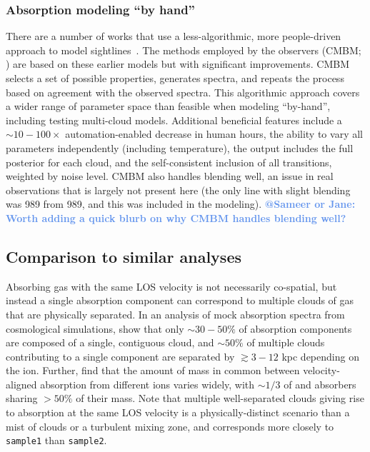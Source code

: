 \documentclass[fleqn,usenatbib]{mnras}
\makeatletter
\newcommand{\atsameer}[1]{\textcolor{CornflowerBlue}{\textbf{@Sameer or Jane: #1}}}
\makeatother
\begin{document}
\subsubsection{Absorption modeling ``by hand''}

There are a number of works that use a less-algorithmic, more people-driven approach to model sightlines~\citep[e.g.][]{churchill1999Multiple, charlton2000anticipating, charlton2003high, ding2003quadruple, ding2003multiphase, ding2005absorption, zonak2004absorption, masiero2005models, lynch2007physical, misawa2008supersolar, lacki2010z, jones2010bare, muzahid2015Extreme, richter2018New, rosenwasser2018understanding, norris2021Discovery}.
The methods employed by the observers (CMBM; \citealt{sameer2021Cloudbycloud, sameer2022Probing}) are based on these earlier models but with significant improvements.
CMBM selects a set of possible properties, generates spectra, and repeats the process based on agreement with the observed spectra.
This algorithmic approach covers a wider range of parameter space than feasible when modeling ``by-hand'', including testing multi-cloud models.
Additional beneficial features include
a $\sim 10-100 \times$ automation-enabled decrease in human hours,
the ability to vary all parameters independently (including temperature),
the output includes the full posterior for each cloud,
and the self-consistent inclusion of all transitions, weighted by noise level.
CMBM also handles blending well, an issue in real observations that is largely not present here
(the only line with slight blending was  989 from  989, and this was included in the modeling).
\atsameer{Worth adding a quick blurb on why CMBM handles blending well?}

\subsection{Comparison to similar analyses}

Absorbing gas with the same LOS velocity is not necessarily co-spatial, but instead a single absorption component can correspond to multiple clouds of gas that are physically separated.
In an analysis of mock absorption spectra from cosmological simulations, \cite{marra2022Examining} show that only $\sim 30-50\%$ of absorption components are composed of a single, contiguous cloud, and $\sim 50\%$ of multiple clouds contributing to a single component are separated by $\gtrsim 3-12$ kpc depending on the ion.
Further, \cite{marra2022Examining} find that the amount of mass in common between velocity-aligned absorption from different ions varies widely, with $\sim 1/3$ of  and  absorbers sharing $>50\%$ of their mass.
Note that multiple well-separated clouds giving rise to absorption at the same LOS velocity is a physically-distinct scenario than a mist of clouds or a turbulent mixing zone, and corresponds more closely to \texttt{sample1} than \texttt{sample2}.
\end{document}

